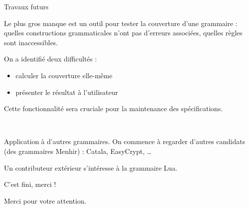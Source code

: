 \documentclass{beamer}          %
\begin{document}
\begin{frame}{Travaux futurs}

Le plus gros manque est un outil pour tester la couverture d'une grammaire : quelles constructions grammaticales n'ont pas d'erreurs associées, quelles règles sont inaccessibles.

On a identifié deux difficultés :
\begin{itemize}
  \item calculer la couverture elle-même
  \item présenter le résultat à l'utilisateur
\end{itemize}

Cette fonctionnalité sera cruciale pour la maintenance des spécifications.

\

\pause
Application à d'autres grammaires. On commence à regarder d'autres candidats (des grammaires Menhir) : Catala, EasyCrypt, \ldots

Un contributeur extérieur s'intéresse à la grammaire Lua.

\end{frame}

\begin{frame}{C'est fini, merci !}

  Merci pour votre attention.

\end{frame}
\end{document}
